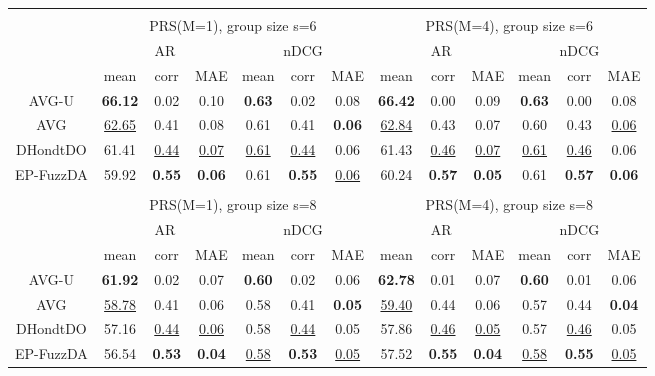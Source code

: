 \begin{tabular}{ c | c c c | c c c || c c c | c c c}
\multicolumn{12}{c}{} \\
\multicolumn{1}{c}{} & \multicolumn{6}{c}{PRS(M=1), group size s=6} & \multicolumn{6}{c}{PRS(M=4), group size s=6} \\
\multicolumn{1}{c}{} & \multicolumn{3}{c}{AR} & \multicolumn{3}{c}{nDCG} & \multicolumn{3}{c}{AR} & \multicolumn{3}{c}{nDCG} \\
& mean & corr & MAE & mean & corr & MAE & mean & corr & MAE & mean & corr & MAE \\
\hline
AVG-U & \textbf{66.12} & 0.02 & 0.10 & \textbf{0.63} & 0.02 & 0.08 & \textbf{66.42} & 0.00 & 0.09 & \textbf{0.63} & 0.00 & 0.08 \\
AVG & \underline{62.65} & 0.41 & 0.08 & 0.61 & 0.41 & \textbf{0.06} & \underline{62.84} & 0.43 & 0.07 & 0.60 & 0.43 & \underline{0.06} \\
DHondtDO & 61.41 & \underline{0.44} & \underline{0.07} & \underline{0.61} & \underline{0.44} & 0.06 & 61.43 & \underline{0.46} & \underline{0.07} & \underline{0.61} & \underline{0.46} & 0.06 \\
EP-FuzzDA & 59.92 & \textbf{0.55} & \textbf{0.06} & 0.61 & \textbf{0.55} & \underline{0.06} & 60.24 & \textbf{0.57} & \textbf{0.05} & 0.61 & \textbf{0.57} & \textbf{0.06} \\

\multicolumn{12}{c}{} \\
\multicolumn{1}{c}{} & \multicolumn{6}{c}{PRS(M=1), group size s=8} & \multicolumn{6}{c}{PRS(M=4), group size s=8} \\
\multicolumn{1}{c}{} & \multicolumn{3}{c}{AR} & \multicolumn{3}{c}{nDCG} & \multicolumn{3}{c}{AR} & \multicolumn{3}{c}{nDCG} \\
& mean & corr & MAE & mean & corr & MAE & mean & corr & MAE & mean & corr & MAE \\
\hline
AVG-U & \textbf{61.92} & 0.02 & 0.07 & \textbf{0.60} & 0.02 & 0.06 & \textbf{62.78} & 0.01 & 0.07 & \textbf{0.60} & 0.01 & 0.06 \\
AVG & \underline{58.78} & 0.41 & 0.06 & 0.58 & 0.41 & \textbf{0.05} & \underline{59.40} & 0.44 & 0.06 & 0.57 & 0.44 & \textbf{0.04} \\
DHondtDO & 57.16 & \underline{0.44} & \underline{0.06} & 0.58 & \underline{0.44} & 0.05 & 57.86 & \underline{0.46} & \underline{0.05} & 0.57 & \underline{0.46} & 0.05 \\
EP-FuzzDA & 56.54 & \textbf{0.53} & \textbf{0.04} & \underline{0.58} & \textbf{0.53} & \underline{0.05} & 57.52 & \textbf{0.55} & \textbf{0.04} & \underline{0.58} & \textbf{0.55} & \underline{0.05} \\

\end{tabular}
